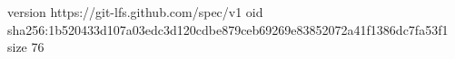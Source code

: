 version https://git-lfs.github.com/spec/v1
oid sha256:1b520433d107a03edc3d120cdbe879ceb69269e83852072a41f1386dc7fa53f1
size 76

